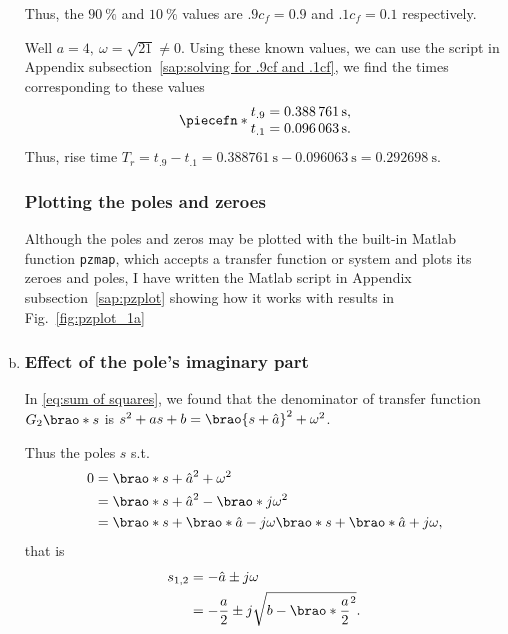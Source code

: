 \documentclass[12pt]{article}
\DeclarePairedDelimiter\brao()%
\DeclarePairedDelimiter\piecefn\{.
\begin{document}
\begin{enumerate}[(a)]
        Thus, the $\SI{90}\percent$ and $\SI{10}\percent$ values are $.9c_f = 0.9$ and $.1c_f = 0.1$ respectively.

        Well $a = 4,\ \omega = \sqrt{21} \not= 0$.
        Using these known values, we can use the script in Appendix subsection~\ref{sap:solving for .9cf and .1cf}, we find the times corresponding to these values
        \begin{equation}
            \piecefn*{
                \begin{array}{@{}l@{}}
                    t_{.9} = \SI{0.388761}\second, \\*
                    t_{.1} = \SI{0.096063}\second. \\*
                \end{array}
            }
        \end{equation}
        Thus, rise time $T_r = t_{.9} - t_{.1} = \SI{0.388761}\second - \SI{0.096063}\second = \SI{0.292698}\second$.

        \subsubsection{Plotting the poles and zeroes}
        Although the poles and zeros may be plotted with the built-in Matlab function \texttt{pzmap}, which accepts a transfer function or system and plots its zeroes and poles,
        I have written the Matlab script in Appendix subsection~\ref{sap:pzplot} showing how it works with results in Fig.~\ref{fig:pzplot_1a}

    \item
        \subsubsection{Effect of the pole's imaginary part}

        In \eqref{eq:sum of squares}, we found that the denominator of transfer function $G_2\brao*s$ is $s^2 + as + b = \brao{s + \hat{a}}^2 + \omega^2$.

        Thus the poles $s$ s.t.
        \begin{equation}
            \begin{aligned}
                0 &{}= \brao*{s + \hat{a}}^2 + \omega^2
            \\*
                  &{}= \brao*{s + \hat{a}}^2 - \brao*{j\omega}^2
            \\*
                  &{}= \brao*{s + \brao*{\hat{a} - j\omega}}\brao*{s + \brao*{\hat{a} + j\omega}},
            \\*
            \end{aligned}
        \end{equation}
        that is
        \begin{equation}
            \begin{aligned}
                s_{1,2} &{}= -\hat{a} \pm j\omega
            \\*
                    &{}= -\frac{a}2 \pm j\sqrt{b - \brao*{\frac{a}2}^2}.
            \end{aligned}
        \end{equation}


\end{enumerate}
\end{document}
